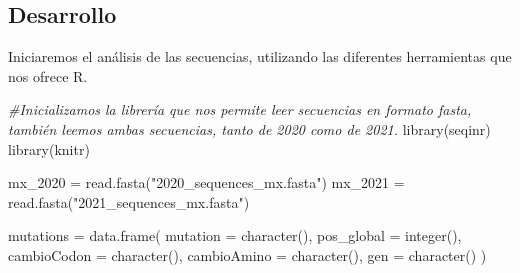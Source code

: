 \documentclass[
]{article}
\newenvironment{Shaded}{\begin{snugshade}}{\end{snugshade}}
\newcommand{\AttributeTok}[1]{\textcolor[rgb]{0.77,0.63,0.00}{#1}}
\newcommand{\CommentTok}[1]{\textcolor[rgb]{0.56,0.35,0.01}{\textit{#1}}}
\newcommand{\FunctionTok}[1]{\textcolor[rgb]{0.00,0.00,0.00}{#1}}
\newcommand{\NormalTok}[1]{#1}
\newcommand{\OtherTok}[1]{\textcolor[rgb]{0.56,0.35,0.01}{#1}}
\newcommand{\StringTok}[1]{\textcolor[rgb]{0.31,0.60,0.02}{#1}}
\begin{document}
\hypertarget{desarrollo}{%
\subsection{Desarrollo}\label{desarrollo}}

Iniciaremos el análisis de las secuencias, utilizando las diferentes
herramientas que nos ofrece R.

\begin{Shaded}
\begin{Highlighting}[]
\CommentTok{\#Inicializamos la librería que nos permite leer secuencias en formato fasta, también leemos ambas secuencias, tanto de 2020 como de 2021.}
\FunctionTok{library}\NormalTok{(seqinr)}
\FunctionTok{library}\NormalTok{(knitr)}

\NormalTok{mx\_2020 }\OtherTok{=} \FunctionTok{read.fasta}\NormalTok{(}\StringTok{"2020\_sequences\_mx.fasta"}\NormalTok{)}
\NormalTok{mx\_2021 }\OtherTok{=} \FunctionTok{read.fasta}\NormalTok{(}\StringTok{"2021\_sequences\_mx.fasta"}\NormalTok{)}

\NormalTok{mutations }\OtherTok{=} \FunctionTok{data.frame}\NormalTok{(}
  \AttributeTok{mutation =} \FunctionTok{character}\NormalTok{(),}
  \AttributeTok{pos\_global =} \FunctionTok{integer}\NormalTok{(),}
  \AttributeTok{cambioCodon =} \FunctionTok{character}\NormalTok{(),}
  \AttributeTok{cambioAmino =} \FunctionTok{character}\NormalTok{(),}
  \AttributeTok{gen =} \FunctionTok{character}\NormalTok{()}
\NormalTok{)}


\end{Highlighting}
\end{Shaded}
\end{document}
